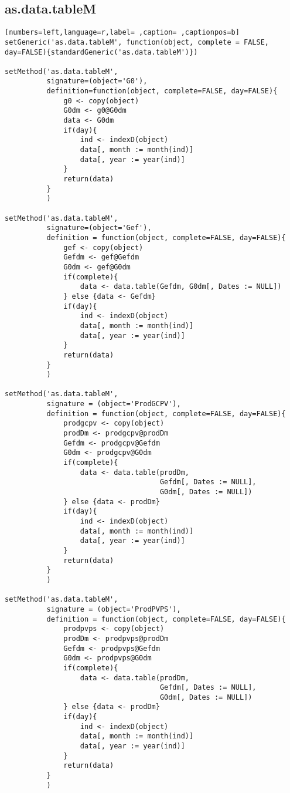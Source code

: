 \subsection{as.data.tableM}
\label{sec:org7ad47a7}
\begin{lstlisting}[numbers=left,language=r,label= ,caption= ,captionpos=b]
setGeneric('as.data.tableM', function(object, complete = FALSE, day=FALSE){standardGeneric('as.data.tableM')})

setMethod('as.data.tableM',
          signature=(object='G0'),
          definition=function(object, complete=FALSE, day=FALSE){
              g0 <- copy(object)
              G0dm <- g0@G0dm
              data <- G0dm
              if(day){
                  ind <- indexD(object)
                  data[, month := month(ind)]
                  data[, year := year(ind)]
              }
              return(data)
          }
          )

setMethod('as.data.tableM',
          signature=(object='Gef'),
          definition = function(object, complete=FALSE, day=FALSE){
              gef <- copy(object)
              Gefdm <- gef@Gefdm
              G0dm <- gef@G0dm
              if(complete){
                  data <- data.table(Gefdm, G0dm[, Dates := NULL])
              } else {data <- Gefdm}
              if(day){
                  ind <- indexD(object)
                  data[, month := month(ind)]
                  data[, year := year(ind)]
              }
              return(data)
          }
          )

setMethod('as.data.tableM',
          signature = (object='ProdGCPV'),
          definition = function(object, complete=FALSE, day=FALSE){
              prodgcpv <- copy(object)
              prodDm <- prodgcpv@prodDm
              Gefdm <- prodgcpv@Gefdm
              G0dm <- prodgcpv@G0dm
              if(complete){
                  data <- data.table(prodDm,
                                     Gefdm[, Dates := NULL],
                                     G0dm[, Dates := NULL])
              } else {data <- prodDm}
              if(day){
                  ind <- indexD(object)
                  data[, month := month(ind)]
                  data[, year := year(ind)]
              }
              return(data)
          }
          )

setMethod('as.data.tableM',
          signature = (object='ProdPVPS'),
          definition = function(object, complete=FALSE, day=FALSE){
              prodpvps <- copy(object)
              prodDm <- prodpvps@prodDm
              Gefdm <- prodpvps@Gefdm
              G0dm <- prodpvps@G0dm
              if(complete){
                  data <- data.table(prodDm,
                                     Gefdm[, Dates := NULL],
                                     G0dm[, Dates := NULL])
              } else {data <- prodDm}
              if(day){
                  ind <- indexD(object)
                  data[, month := month(ind)]
                  data[, year := year(ind)]
              }
              return(data)
          }
          )
\end{lstlisting}
